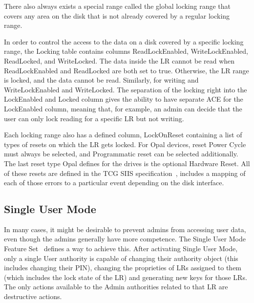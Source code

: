 There also always exists a special range called the global locking range that covers any area on the disk that is not already covered by a regular locking range.

In order to control the access to the data on a disk covered by a specific locking range, the Locking table contains columns ReadLockEnabled, WriteLockEnabled, ReadLocked, and WriteLocked. The data inside the LR cannot be read when ReadLockEnabled and ReadLocked are both set to true. Otherwise, the LR range is locked, and the data cannot be read. Similarly, for writing and WriteLockEnabled and WriteLocked. The separation of the locking right into the LockEnabled and Locked column gives the ability to have separate ACE for the LockEnabled column, meaning that, for example, an admin can decide that the user can only lock reading for a specific LR but not writing. 

Each locking range also has a defined column, LockOnReset containing a list of types of resets on which the LR gets locked. 
For Opal devices, reset Power Cycle must always be selected, and Programmatic reset can be selected additionally. The last reset type Opal defines for the drives is the optional Hardware Reset. All of these resets are defined in the TCG SIIS specification~\cite{tcg-siis}, includes a mapping of each of those errors to a particular event depending on the disk interface.

\subsection{Single User Mode}

In many cases, it might be desirable to prevent admins from accessing user data, even though the admins generally have more competence. 
The Single User Mode Feature Set~\cite{tcg-sum} defines a way to achieve this.
After activating Single User Mode, only a single User authority is capable of changing their authority object (this includes changing their PIN), changing the proprieties of LRs assigned to them (which includes the lock state of the LR) and generating new keys for those LRs.
The only actions available to the Admin authorities related to that LR are destructive actions.

